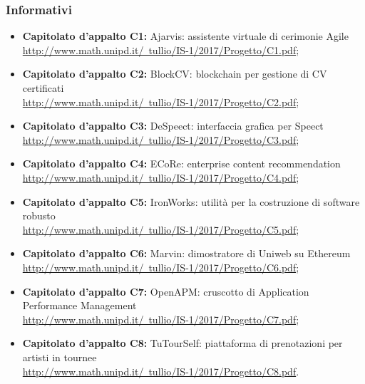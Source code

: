	\subsubsection{Informativi}
		\begin{itemize}
			\item \textbf{Capitolato d'appalto C1:}
			Ajarvis: assistente virtuale di cerimonie Agile\\
			\href{http://www.math.unipd.it/~tullio/IS-1/2017/Progetto/C1.pdf}{http://www.math.unipd.it/~tullio/IS-1/2017/Progetto/C1.pdf};
			\item \textbf{Capitolato d'appalto C2:}
			BlockCV: blockchain per gestione di CV certificati\\
			\href{http://www.math.unipd.it/~tullio/IS-1/2017/Progetto/C2.pdf}{http://www.math.unipd.it/~tullio/IS-1/2017/Progetto/C2.pdf};
			\item \textbf{Capitolato d'appalto C3:}
			DeSpeect: interfaccia grafica per Speect\\
			\href{http://www.math.unipd.it/~tullio/IS-1/2017/Progetto/C3.pdf}{http://www.math.unipd.it/~tullio/IS-1/2017/Progetto/C3.pdf};
			\item \textbf{Capitolato d'appalto C4:}
			ECoRe: enterprise content recommendation\\
			\href{http://www.math.unipd.it/~tullio/IS-1/2017/Progetto/C4.pdf}{http://www.math.unipd.it/~tullio/IS-1/2017/Progetto/C4.pdf};
			\item \textbf{Capitolato d'appalto C5:}
			IronWorks: utilità per la costruzione di software robusto\\
			\href{http://www.math.unipd.it/~tullio/IS-1/2017/Progetto/C5.pdf}{http://www.math.unipd.it/~tullio/IS-1/2017/Progetto/C5.pdf};
			\item \textbf{Capitolato d'appalto C6:}
			Marvin: dimostratore di Uniweb su Ethereum\\
			\href{http://www.math.unipd.it/~tullio/IS-1/2017/Progetto/C6.pdf}{http://www.math.unipd.it/~tullio/IS-1/2017/Progetto/C6.pdf};
			\item \textbf{Capitolato d'appalto C7:}
			OpenAPM: cruscotto di Application Performance Management\\
			\href{http://www.math.unipd.it/~tullio/IS-1/2017/Progetto/C7.pdf}{http://www.math.unipd.it/~tullio/IS-1/2017/Progetto/C7.pdf};
			\item \textbf{Capitolato d'appalto C8:}
			TuTourSelf: piattaforma di prenotazioni per artisti in tournee\\
			\href{http://www.math.unipd.it/~tullio/IS-1/2017/Progetto/C8.pdf}{http://www.math.unipd.it/~tullio/IS-1/2017/Progetto/C8.pdf}.
		\end{itemize}